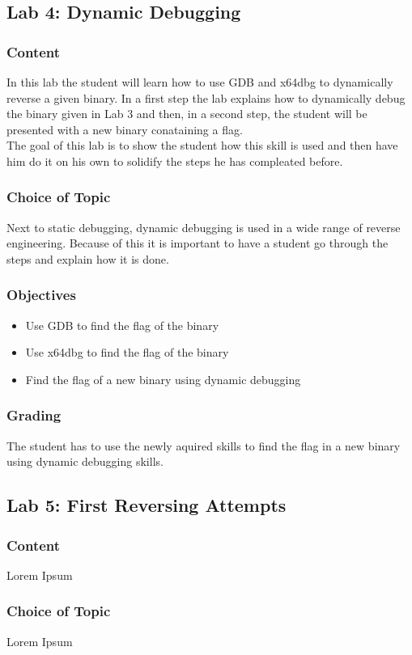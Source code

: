 \subsection{Lab 4: Dynamic Debugging}
\subsubsection*{Content}
In this lab the student will learn how to use GDB and x64dbg to dynamically reverse a given binary. In a first step the lab explains how to dynamically debug the binary given in Lab 3 and then, in a second step, the student will be presented with a new binary conataining a flag. \\
The goal of this lab is to show the student how this skill is used and then have him do it on his own to solidify the steps he has compleated before.
\subsubsection*{Choice of Topic}
Next to static debugging, dynamic debugging is used in a wide range of reverse engineering. Because of this it is important to have a student go through the steps and explain how it is done. 
\subsubsection*{Objectives}
\begin{itemize}
    \item Use GDB to find the flag of the binary
    \item Use x64dbg to find the flag of the binary
    \item Find the flag of a new binary using dynamic debugging
\end{itemize}
\subsubsection*{Grading}
The student has to use the newly aquired skills to find the flag in a new binary using dynamic debugging skills.

\subsection{Lab 5: First Reversing Attempts}
\subsubsection*{Content}
Lorem Ipsum
\subsubsection*{Choice of Topic}
Lorem Ipsum
